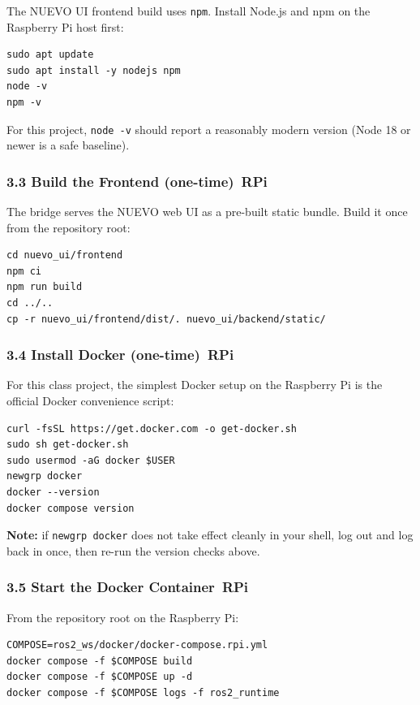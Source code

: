 \documentclass{ol-softwaremanual}
\newcommand{\onrpi}{%
  \,\colorbox{blue!20}{\footnotesize\sffamily\bfseries RPi}}
\begin{document}
The NUEVO UI frontend build uses \texttt{npm}. Install Node.js and npm on the
Raspberry Pi host first:

\begin{verbatim}
sudo apt update
sudo apt install -y nodejs npm
node -v
npm -v
\end{verbatim}

For this project, \texttt{node -v} should report a reasonably modern version
(Node 18 or newer is a safe baseline).

\subsubsection*{3.3 Build the Frontend (one-time)\onrpi}

The bridge serves the NUEVO web UI as a pre-built static bundle.
Build it once from the repository root:

\begin{verbatim}
cd nuevo_ui/frontend
npm ci
npm run build
cd ../..
cp -r nuevo_ui/frontend/dist/. nuevo_ui/backend/static/
\end{verbatim}

\subsubsection*{3.4 Install Docker (one-time)\onrpi}

For this class project, the simplest Docker setup on the Raspberry Pi is the
official Docker convenience script:

\begin{verbatim}
curl -fsSL https://get.docker.com -o get-docker.sh
sudo sh get-docker.sh
sudo usermod -aG docker $USER
newgrp docker
docker --version
docker compose version
\end{verbatim}

\textbf{Note:} if \texttt{newgrp docker} does not take effect cleanly in your
shell, log out and log back in once, then re-run the version checks above.

\subsubsection*{3.5 Start the Docker Container\onrpi}

From the repository root on the Raspberry Pi:

\begin{verbatim}
COMPOSE=ros2_ws/docker/docker-compose.rpi.yml
docker compose -f $COMPOSE build
docker compose -f $COMPOSE up -d
docker compose -f $COMPOSE logs -f ros2_runtime
\end{verbatim}
\end{document}
